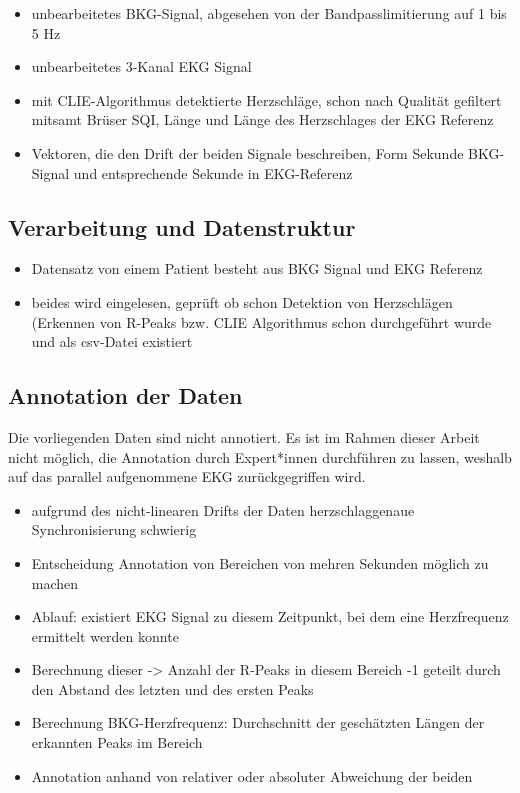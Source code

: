 	\begin{itemize}
		\item unbearbeitetes \ac{BKG}-Signal, abgesehen von der Bandpasslimitierung auf 1 bis 5 Hz
		\item unbearbeitetes 3-Kanal EKG Signal
		\item mit CLIE-Algorithmus detektierte Herzschläge, schon nach Qualität gefiltert mitsamt Brüser SQI, Länge und Länge des Herzschlages der EKG Referenz
		\item Vektoren, die den Drift der beiden Signale beschreiben, Form Sekunde \ac{BKG}-Signal und entsprechende Sekunde in \ac{EKG}-Referenz
	\end{itemize}
	
	\subsection{Verarbeitung und Datenstruktur}
	
	\begin{itemize}
		\item Datensatz von einem Patient besteht aus BKG Signal und EKG Referenz
		\item beides wird eingelesen, geprüft ob schon Detektion von Herzschlägen (Erkennen von R-Peaks bzw. CLIE Algorithmus schon durchgeführt wurde und als csv-Datei existiert
	\end{itemize}

	\subsection{Annotation der Daten}
	
	Die vorliegenden Daten sind nicht annotiert. Es ist im Rahmen dieser Arbeit nicht möglich, die Annotation durch Expert*innen durchführen zu lassen, weshalb auf das parallel aufgenommene \ac{EKG} zurückgegriffen wird.
	
	\begin{itemize}
		\item aufgrund des nicht-linearen Drifts der Daten herzschlaggenaue Synchronisierung schwierig
		\item Entscheidung Annotation von Bereichen von mehren Sekunden möglich zu machen
		\item Ablauf: existiert EKG Signal zu diesem Zeitpunkt, bei dem eine Herzfrequenz ermittelt werden konnte
		\item Berechnung dieser -> Anzahl der R-Peaks in diesem Bereich -1 geteilt durch den Abstand des letzten und des ersten Peaks
		\item Berechnung \ac{BKG}-Herzfrequenz: Durchschnitt der geschätzten Längen der erkannten Peaks im Bereich
		\item Annotation anhand von relativer oder absoluter Abweichung der beiden
	\end{itemize}
	

